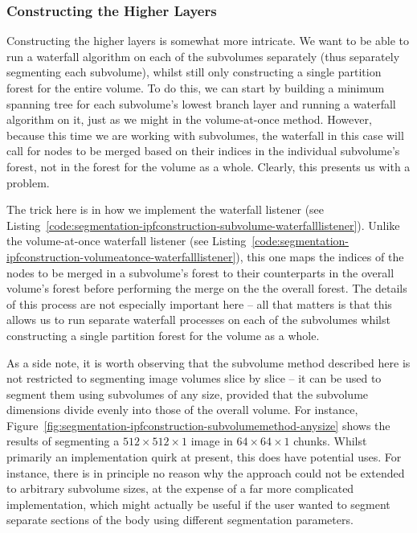 \subsubsection{Constructing the Higher Layers}

Constructing the higher layers is somewhat more intricate. We want to be able to run a waterfall algorithm on each of the subvolumes separately (thus separately segmenting each subvolume), whilst still only constructing a single partition forest for the entire volume. To do this, we can start by building a minimum spanning tree for each subvolume's lowest branch layer and running a waterfall algorithm on it, just as we might in the volume-at-once method. However, because this time we are working with subvolumes, the waterfall in this case will call for nodes to be merged based on their indices in the individual subvolume's forest, not in the forest for the volume as a whole. Clearly, this presents us with a problem.

The trick here is in how we implement the waterfall listener (see Listing~\ref{code:segmentation-ipfconstruction-subvolume-waterfalllistener}). Unlike the volume-at-once waterfall listener (see Listing~\ref{code:segmentation-ipfconstruction-volumeatonce-waterfalllistener}), this one maps the indices of the nodes to be merged in a subvolume's forest to their counterparts in the overall volume's forest before performing the merge on the the overall forest. The details of this process are not especially important here -- all that matters is that this allows us to run separate waterfall processes on each of the subvolumes whilst constructing a single partition forest for the volume as a whole.

As a side note, it is worth observing that the subvolume method described here is not restricted to segmenting image volumes slice by slice -- it can be used to segment them using subvolumes of any size, provided that the subvolume dimensions divide evenly into those of the overall volume. For instance, Figure~\ref{fig:segmentation-ipfconstruction-subvolumemethod-anysize} shows the results of segmenting a $512 \times 512 \times 1$ image in $64 \times 64 \times 1$ chunks. Whilst primarily an implementation quirk at present, this does have potential uses. For instance, there is in principle no reason why the approach could not be extended to arbitrary subvolume sizes, at the expense of a far more complicated implementation, which might actually be useful if the user wanted to segment separate sections of the body using different segmentation parameters.


